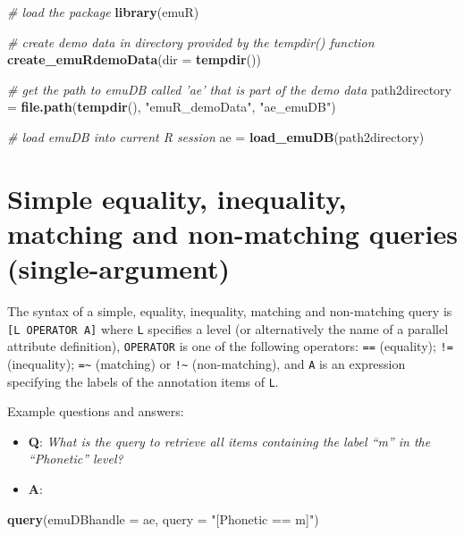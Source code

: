 \documentclass[]{book}
\newenvironment{Shaded}{\begin{snugshade}}{\end{snugshade}}
\newcommand{\CommentTok}[1]{\textcolor[rgb]{0.56,0.35,0.01}{\textit{#1}}}
\newcommand{\DataTypeTok}[1]{\textcolor[rgb]{0.13,0.29,0.53}{#1}}
\newcommand{\KeywordTok}[1]{\textcolor[rgb]{0.13,0.29,0.53}{\textbf{#1}}}
\newcommand{\NormalTok}[1]{#1}
\newcommand{\StringTok}[1]{\textcolor[rgb]{0.31,0.60,0.02}{#1}}
\providecommand{\tightlist}{%
  \setlength{\itemsep}{0pt}\setlength{\parskip}{0pt}}
\begin{document}
\begin{Shaded}
\begin{Highlighting}[]
\CommentTok{# load the package }
\KeywordTok{library}\NormalTok{(emuR)}

\CommentTok{# create demo data in directory provided by the tempdir() function}
\KeywordTok{create_emuRdemoData}\NormalTok{(}\DataTypeTok{dir =} \KeywordTok{tempdir}\NormalTok{())}

\CommentTok{# get the path to emuDB called 'ae' that is part of the demo data}
\NormalTok{path2directory =}\StringTok{ }\KeywordTok{file.path}\NormalTok{(}\KeywordTok{tempdir}\NormalTok{(), }\StringTok{"emuR_demoData"}\NormalTok{, }\StringTok{"ae_emuDB"}\NormalTok{)}

\CommentTok{# load emuDB into current R session}
\NormalTok{ae =}\StringTok{ }\KeywordTok{load_emuDB}\NormalTok{(path2directory)}
\end{Highlighting}
\end{Shaded}

\hypertarget{simple-equality-inequality-matching-non-matching-queries-single-argument}{%
\section{Simple equality, inequality, matching and non-matching queries (single-argument)}\label{simple-equality-inequality-matching-non-matching-queries-single-argument}}

The syntax of a simple, equality, inequality, matching and non-matching query is \texttt{{[}L\ OPERATOR\ A{]}} where \texttt{L} specifies a level (or alternatively the name of a parallel attribute definition), \texttt{OPERATOR} is one of the following operators: \texttt{==} (equality); \texttt{!=} (inequality); \texttt{=\textasciitilde{}} (matching) or \texttt{!\textasciitilde{}} (non-matching), and \texttt{A} is an expression specifying the labels of the annotation items of \texttt{L}.

Example questions and answers:

\begin{itemize}
\tightlist
\item
  \textbf{Q}: \emph{What is the query to retrieve all items containing the label ``m'' in the ``Phonetic'' level?}
\item
  \textbf{A}:
\end{itemize}

\begin{Shaded}
\begin{Highlighting}[]
\KeywordTok{query}\NormalTok{(}\DataTypeTok{emuDBhandle =}\NormalTok{ ae, }
      \DataTypeTok{query =} \StringTok{"[Phonetic == m]"}\NormalTok{)}
\end{Highlighting}
\end{Shaded}
\end{document}
